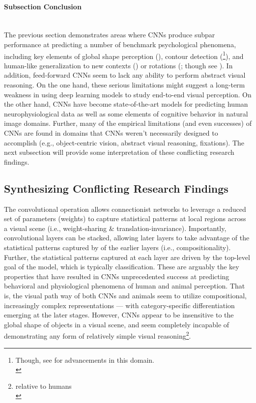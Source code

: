 \documentclass[12pt]{article}
\let\oldcite=\cite
\renewcommand{\cite}[1]{\textcolor[rgb]{0, .121, .388}{\oldcite{#1}}}
\begin{document}
\paragraph{Subsection Conclusion}\mbox{} \\

The previous section demonstrates areas where CNNs produce subpar performance at predicting a number of benchmark psychological phenomena, including key elements of global shape perception (\cite{baker2018deep}), contour detection (\cite{baker2018contour}\footnote{Though, see \cite{yang2016object} for advancements in this domain. \\}), and human-like generalization to new contexts (\cite{rosenfeld2018elephant}) or rotations (\cite{erdogan2017visual}; though see \cite{kheradpisheh2016humans}). In addition, feed-forward CNNs seem to lack any ability to perform abstract visual reasoning. On the one hand, these serious limitations might suggest a long-term weakness in using deep learning models to study end-to-end visual perception. On the other hand, CNNs have become state-of-the-art models for predicting human neurophysiological data as well as some elements of cognitive behavior in natural image domains. Further, many of the empirical limitations (and even successes) of CNNs are found in domains that CNNs weren't necessarily designed to accomplish (e.g., object-centric vision, abstract visual reasoning, fixations). The next subsection will provide some interpretation of these conflicting research findings.

\subsection{Synthesizing Conflicting Research Findings}

The convolutional operation allows connectionist networks to leverage a reduced
set of parameters (weights) to capture statistical patterns at local
regions across a visual scene (i.e., weight-sharing \& translation-invariance). Importantly, convolutional layers can be stacked, allowing later layers to take advantage of the statistical patterns captured by of the earlier layers (i.e., compositionality). Further, the statistical patterns captured at each layer are driven by the top-level goal of the model, which is typically classification. These are arguably the key properties that have resulted in CNNs unprecedented success at predicting behavioral and physiological phenomena of human and animal perception. That is, the visual path way of both CNNs and animals seem to utilize compositional, increasingly complex representations --- with category-specific differentiation emerging at the later stages. However, CNNs appear to be insensitive to the global shape of objects in a visual scene, and seem completely incapable of demonstrating any form of relatively simple visual reasoning\footnote{relative to humans \\}.
\end{document}
